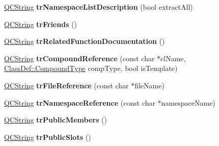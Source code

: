 \begin{DoxyCompactItemize}
\item 
\hypertarget{class_translator_dutch_a4deddc96cf84bd66a4ffb8174a5d052b}{\hyperlink{class_q_c_string}{Q\-C\-String} {\bfseries tr\-Namespace\-List\-Description} (bool extract\-All)}\label{class_translator_dutch_a4deddc96cf84bd66a4ffb8174a5d052b}

\item 
\hypertarget{class_translator_dutch_a09300dedef1bc1ce5c2de5d70e6051bf}{\hyperlink{class_q_c_string}{Q\-C\-String} {\bfseries tr\-Friends} ()}\label{class_translator_dutch_a09300dedef1bc1ce5c2de5d70e6051bf}

\item 
\hypertarget{class_translator_dutch_ae97d87449f2ff86c736e70fdeb6c2534}{\hyperlink{class_q_c_string}{Q\-C\-String} {\bfseries tr\-Related\-Function\-Documentation} ()}\label{class_translator_dutch_ae97d87449f2ff86c736e70fdeb6c2534}

\item 
\hypertarget{class_translator_dutch_ad81a0f65ba81e71d53ed3362a7d2b074}{\hyperlink{class_q_c_string}{Q\-C\-String} {\bfseries tr\-Compound\-Reference} (const char $\ast$cl\-Name, \hyperlink{class_class_def_a768a6f0a6fd7e9087ff7971abbcc3f36}{Class\-Def\-::\-Compound\-Type} comp\-Type, bool is\-Template)}\label{class_translator_dutch_ad81a0f65ba81e71d53ed3362a7d2b074}

\item 
\hypertarget{class_translator_dutch_ab665cdc5cebda16bb4acbdc62718a2ba}{\hyperlink{class_q_c_string}{Q\-C\-String} {\bfseries tr\-File\-Reference} (const char $\ast$file\-Name)}\label{class_translator_dutch_ab665cdc5cebda16bb4acbdc62718a2ba}

\item 
\hypertarget{class_translator_dutch_a8afd00694e0e220867c090eecfdd861a}{\hyperlink{class_q_c_string}{Q\-C\-String} {\bfseries tr\-Namespace\-Reference} (const char $\ast$namespace\-Name)}\label{class_translator_dutch_a8afd00694e0e220867c090eecfdd861a}

\item 
\hypertarget{class_translator_dutch_a21c92afb604c94e0636482e72081e182}{\hyperlink{class_q_c_string}{Q\-C\-String} {\bfseries tr\-Public\-Members} ()}\label{class_translator_dutch_a21c92afb604c94e0636482e72081e182}

\item 
\hypertarget{class_translator_dutch_a9ea325858f846bec828dadd21d58ec0f}{\hyperlink{class_q_c_string}{Q\-C\-String} {\bfseries tr\-Public\-Slots} ()}\label{class_translator_dutch_a9ea325858f846bec828dadd21d58ec0f}


\end{DoxyCompactItemize}
